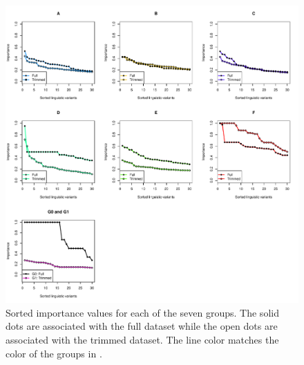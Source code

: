\documentclass[output=paper]{LSP/langsci}
\begin{document}
\begin{figure}
\includegraphics[width=\textwidth]{illustrations/wiel_monte_fig3}
\caption{Sorted importance values for each of the seven groups. The solid dots are associated with the full dataset while the open dots are associated with the trimmed dataset. The line color matches the color of the groups in .}
\label{fig:3}
\end{figure}
\end{document}
